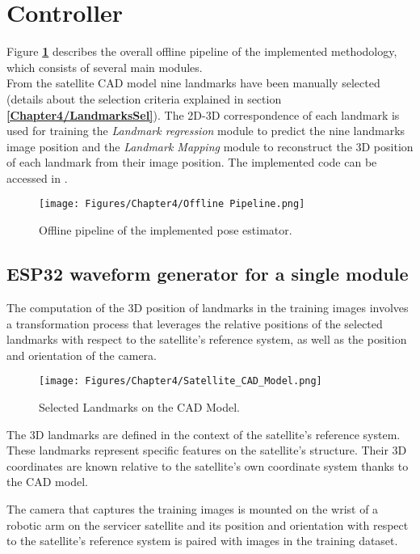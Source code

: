 \section{Controller}
Figure \textbf{\ref{fig:Offline Pipeline}} describes the overall offline pipeline of the implemented methodology, which consists of several main modules.\\
From the satellite CAD model nine landmarks have been manually selected (details about the selection criteria explained in section \textbf{\ref{Chapter4/LandmarksSel}}). The 2D-3D correspondence of each landmark is used for training the \textit{Landmark regression} module to predict the nine landmarks image position and the \textit{Landmark Mapping} module to reconstruct the 3D position of each landmark from their image position.
The implemented code can be accessed in \cite{JMF}.

\begin{figure}[th]
    \centering
    \texttt{[image: Figures/Chapter4/Offline Pipeline.png]}
    \caption[Offline pipeline]{Offline pipeline of the implemented pose estimator.}
    \label{fig:Offline Pipeline}
\end{figure}

\subsection{ESP32 waveform generator for a single module}

\label{Chapter4/2D-3D}
The computation of the 3D position of landmarks in the training images involves a transformation process that leverages the relative positions of the selected landmarks with respect to the satellite's reference system, as well as the position and orientation of the camera.

\begin{figure}[th]
    \centering
    \texttt{[image: Figures/Chapter4/Satellite\_CAD\_Model.png]}
    \caption[CAD Model]{Selected Landmarks on the CAD Model.}
    \label{fig:CAD Model}
\end{figure}

The 3D landmarks are defined in the context of the satellite's reference system. These landmarks represent specific features on the satellite's structure. Their 3D coordinates are known relative to the satellite's own coordinate system thanks to the CAD model.

The camera that captures the training images is mounted on the wrist of a robotic arm on the servicer satellite and its position and orientation with respect to the satellite's reference system is paired with images in the training dataset.

